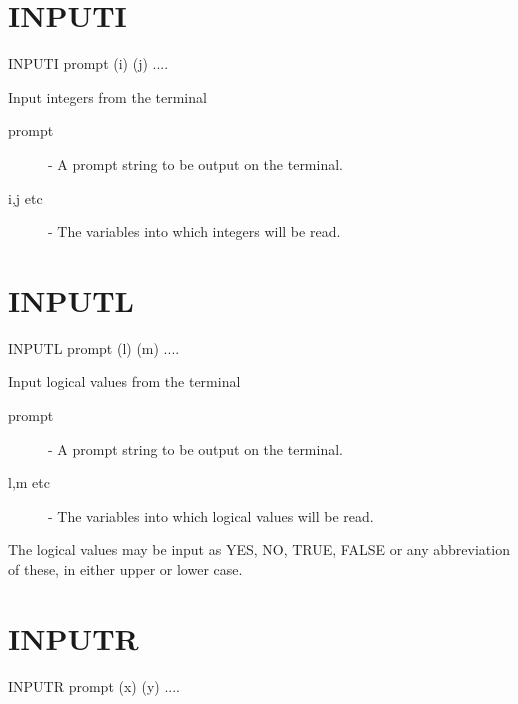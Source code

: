 \section{INPUTI}


    INPUTI \hspace{.5cm} prompt \hspace{.5cm} (i) \hspace{.5cm} (j)  ....

 Input integers from the terminal

\begin{description}

\item[prompt]  -  A prompt string to be output on the terminal.

\item[i,\/j etc] -  The variables into which integers will be read.

\end{description}

\section{INPUTL}


    INPUTL \hspace{.5cm} prompt \hspace{.5cm} (l) \hspace{.5cm} (m)  ....

 Input logical values from the terminal

\begin{description}

\item[prompt]  -  A prompt string to be output on the terminal.

\item[l,m etc] -  The variables into which logical values will be read.

\end{description}
The logical values may be input as YES, NO, TRUE, FALSE or any
abbreviation of these, in either upper or lower case.


\section{INPUTR}

    INPUTR \hspace{.5cm} prompt \hspace{.5cm} (x) \hspace{.5cm} (y)  ....

